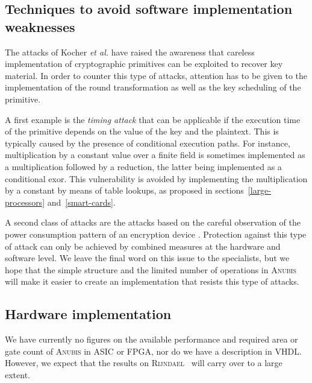 \documentclass{llncs}
\begin{document}
\subsection{Techniques to avoid software implementation weaknesses}

The attacks of Kocher \emph{et al.} \cite{timing,power} have raised the
awareness that careless implementation of cryptographic primitives
can be exploited to recover key material. In order to counter this
type of attacks, attention has to be given to the implementation of
the round transformation as well as the key scheduling of the primitive.

A first example is the \emph{timing attack} \cite{timing} that can be applicable
if the execution time of the primitive depends on the value of
the key and the plaintext. This is typically caused by the
presence of conditional execution paths. For instance, multiplication
by a constant value over a finite field is sometimes implemented
as a multiplication followed by a reduction, the latter being
implemented as a conditional exor. This vulnerability is avoided
by implementing the multiplication by a constant by means of table
lookups, as proposed in sections~\ref{large-processors} and~\ref{smart-cards}.

A second class of attacks are the attacks based on the careful
observation of the power consumption pattern of an encryption
device \cite{power}. Protection against this type of attack can
only be achieved by combined measures at the hardware and
software level. We leave the final word on this issue to the
specialists, but we hope that the simple structure and the
limited number of operations in \textsc{\mbox{Anubis}} will make
it easier to create an implementation that resists this type of
attacks.

%

\subsection{Hardware implementation}

We have currently no figures on the available performance and
required area or gate count of \textsc{Anubis} in ASIC or FPGA,
nor do we have a description in VHDL. However, we expect that the
results on \textsc{\mbox{Rijndael}}~\cite{hw1,hw2} will carry
over to a large extent.
\end{document}
